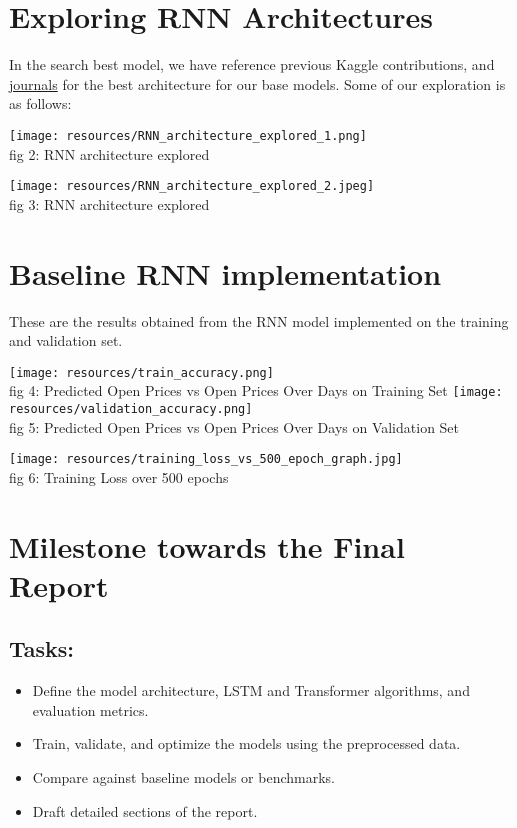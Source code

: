 \documentclass{article}
\begin{document}
\section*{Exploring RNN Architectures}
In the search best model, we have reference previous Kaggle contributions, and \href{https://iopscience.iop.org/article/10.1088/1742-6596/1650/3/032103/pdf}{journals} for the best architecture for our base models. Some of our exploration is as follows: 
\begin{multicols}{2}
    \begin{center}
    \texttt{[image: resources/RNN\_architecture\_explored\_1.png]} \\
        fig 2: RNN architecture explored
    \end{center}
    \columnbreak
    \begin{center}
        \texttt{[image: resources/RNN\_architecture\_explored\_2.jpeg]} \\
            fig 3: RNN architecture explored
    \end{center}
\end{multicols}

\newpage
\section*{Baseline RNN implementation}
These are the results obtained from the RNN model implemented on the training and validation set.
\begin{center}
    \texttt{[image: resources/train\_accuracy.png]}\\
    fig 4: Predicted Open Prices vs Open Prices Over Days on Training Set
    \newline
    \texttt{[image: resources/validation\_accuracy.png]}\\
    fig 5: Predicted Open Prices vs Open Prices Over Days on Validation Set
\end{center}
\begin{center}
    \texttt{[image: resources/training\_loss\_vs\_500\_epoch\_graph.jpg]} \\
    fig 6: Training Loss over 500 epochs
\end{center}
\newpage

\section*{Milestone towards the Final Report}
\subsection*{Tasks:}
\begin{itemize}
    \item Define the model architecture, LSTM and Transformer algorithms, and evaluation metrics.
    \item Train, validate, and optimize the models using the preprocessed data.
    \item Compare against baseline models or benchmarks.
    \item Draft detailed sections of the report.
\end{itemize}
\end{document}
